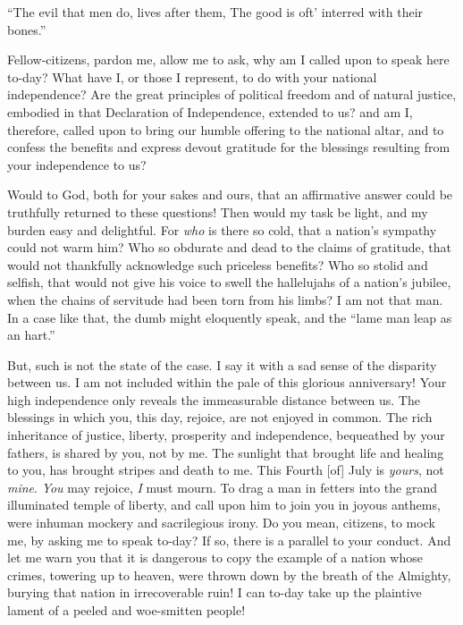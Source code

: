 “The evil that men do, lives after them, The good is oft’ interred with their bones.”\par

Fellow-citizens, pardon me, allow me to ask, why am I called upon to speak here to-day? What have I, or those I represent, to do with your national independence? Are the great principles of political freedom and of natural justice, embodied in that Declaration of Independence, extended to us? and am I, therefore, called upon to bring our humble offering to the national altar, and to confess the benefits and express devout gratitude for the blessings resulting from your independence to us?\par

Would to God, both for your sakes and ours, that an affirmative answer could be truthfully returned to these questions! Then would my task be light, and my burden easy and delightful. For \textit{who} is there so cold, that a nation’s sympathy could not warm him? Who so obdurate and dead to the claims of gratitude, that would not thankfully acknowledge such priceless benefits? Who so stolid and selfish, that would not give his voice to swell the hallelujahs of a nation’s jubilee, when the chains of servitude had been torn from his limbs? I am not that man. In a case like that, the dumb might eloquently speak, and the “lame man leap as an hart.”\par

But, such is not the state of the case. I say it with a sad sense of the disparity between us. I am not included within the pale of this glorious anniversary! Your high independence only reveals the immeasurable distance between us. The blessings in which you, this day, rejoice, are not enjoyed in common. The rich inheritance of justice, liberty, prosperity and independence, bequeathed by your fathers, is shared by you, not by me. The sunlight that brought life and healing to you, has brought stripes and death to me. This Fourth [of] July is \textit{yours}, not \textit{mine}. \textit{You} may rejoice, \textit{I} must mourn. To drag a man in fetters into the grand illuminated temple of liberty, and call upon him to join you in joyous anthems, were inhuman mockery and sacrilegious irony. Do you mean, citizens, to mock me, by asking me to speak to-day? If so, there is a parallel to your conduct. And let me warn you that it is dangerous to copy the example of a nation whose crimes, towering up to heaven, were thrown down by the breath of the Almighty, burying that nation in irrecoverable ruin! I can to-day take up the plaintive lament of a peeled and woe-smitten people!\par


